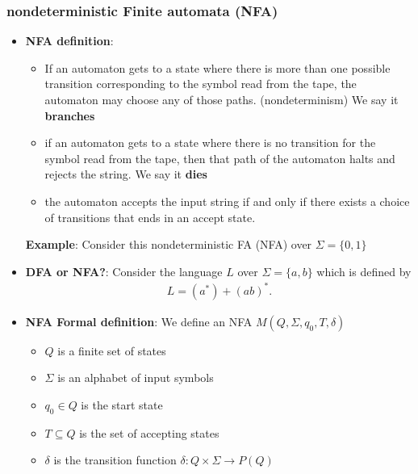 \documentclass{report}
\begin{document}
    \subsubsection{nondeterministic Finite automata (NFA)}
    \begin{itemize}
        \item \textbf{NFA definition}:
            \begin{itemize}
                \item If an automaton gets to a state where there is more than one possible transition corresponding to the symbol read from the tape, the automaton may  choose any of those paths. (nondeterminism) We say it \textbf{branches}
                \item if an automaton gets to a state where there is no transition for the symbol read from the tape, then that path of the automaton halts and rejects the string. We say it \textbf{dies}
                \item the automaton accepts the input string if and only if there exists a choice of transitions that ends in an accept state.
            \end{itemize}
            \bigbreak \noindent 
            \textbf{Example}: Consider this nondeterministic FA (NFA) over $\Sigma = \{0, 1\}$
            \bigbreak \noindent 
        \item \textbf{DFA or NFA?}:
            Consider the language $L$ over $\Sigma = \{a, b\}$ which is defined by
            \begin{align*}
                L = (a^{*}) + (ab)^{*}
            .\end{align*}
            \bigbreak \noindent 
        \item \textbf{NFA Formal definition}: We define an NFA $M(Q, \Sigma, q_{0}, T, \delta) $
            \begin{itemize}
                \item $Q$ is a finite set of states
                \item $\Sigma$ is an alphabet of input symbols
                \item $q_0 \in Q$ is the start state
                \item $T \subseteq Q$ is the set of accepting states
                \item $\delta$ is the transition function $\delta: Q \times \Sigma \to P(Q)$
            \end{itemize}

\end{itemize}
\end{document}
